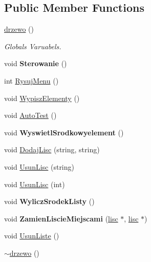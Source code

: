 \subsection*{Public Member Functions}
\begin{DoxyCompactItemize}
\item 
\hyperlink{classdrzewo_a555c14101f8c11cf9344ecf8f8cf87b0}{drzewo} ()
\begin{DoxyCompactList}\small\item\em Globals Varuabels. \item\end{DoxyCompactList}\item 
\hypertarget{classdrzewo_a422dd6cee740c4db7c5b212c0c4e6fa9}{
void {\bfseries Sterowanie} ()}
\label{classdrzewo_a422dd6cee740c4db7c5b212c0c4e6fa9}

\item 
int \hyperlink{classdrzewo_af129795d6fd7898310227906056f6d41}{RysujMenu} ()
\item 
void \hyperlink{classdrzewo_a42f04ceb16b668eb4c326d70753249c1}{WypiszElementy} ()
\item 
void \hyperlink{classdrzewo_a69c8619ac7339ce26f1c092c918c42dc}{AutoTest} ()
\item 
\hypertarget{classdrzewo_a68d3eb978fff8ecd8d9ff1a42deeeaa4}{
void {\bfseries WyswietlSrodkowyelement} ()}
\label{classdrzewo_a68d3eb978fff8ecd8d9ff1a42deeeaa4}

\item 
void \hyperlink{classdrzewo_affe40fef12dfebfca7e1b46a73bdbb8d}{DodajLisc} (string, string)
\item 
void \hyperlink{classdrzewo_a05086f97ce01ade43dc3ff7a441d9f55}{UsunLisc} (string)
\item 
void \hyperlink{classdrzewo_a01f1a0204f7353311e2015d18347e383}{UsunLisc} (int)
\item 
\hypertarget{classdrzewo_aacdc1ac5e09c2a1811e5d51a2a7bccab}{
void {\bfseries WyliczSrodekListy} ()}
\label{classdrzewo_aacdc1ac5e09c2a1811e5d51a2a7bccab}

\item 
\hypertarget{classdrzewo_a4101c51956d4eff7745e0ea9ecc8eef2}{
void {\bfseries ZamienLiscieMiejscami} (\hyperlink{classdrzewo_1_1lisc}{lisc} $\ast$, \hyperlink{classdrzewo_1_1lisc}{lisc} $\ast$)}
\label{classdrzewo_a4101c51956d4eff7745e0ea9ecc8eef2}

\item 
void \hyperlink{classdrzewo_aae2e7025da136b328c490706677a66b5}{UsunListe} ()
\item 
\hyperlink{classdrzewo_a5d91af876b63be1f89bd93c9e8745aa7}{$\sim$drzewo} ()
\end{DoxyCompactItemize}
